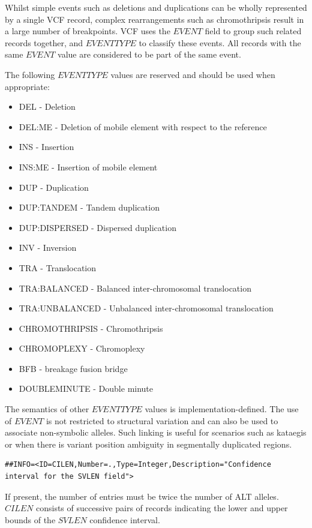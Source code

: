 \documentclass[8pt]{article}
\begin{document}
Whilst simple events such as deletions and duplications can be wholly represented by a single VCF record, complex rearrangements such as chromothripsis result in a large number of breakpoints.
VCF uses the $EVENT$ field to group such related records together, and $EVENTTYPE$ to classify these events.
All records with the same $EVENT$ value are considered to be part of the same event.

The following $EVENTTYPE$ values are reserved and should be used when appropriate:

\begin{itemize}
  \item DEL - Deletion
  \item DEL:ME - Deletion of mobile element with respect to the reference
  \item INS - Insertion
  \item INS:ME - Insertion of mobile element
  \item DUP - Duplication
  \item DUP:TANDEM - Tandem duplication
  \item DUP:DISPERSED - Dispersed duplication
  \item INV - Inversion
  \item TRA - Translocation
  \item TRA:BALANCED - Balanced inter-chromosomal translocation
  \item TRA:UNBALANCED - Unbalanced inter-chromosomal translocation
  \item CHROMOTHRIPSIS - Chromothripsis
  \item CHROMOPLEXY - Chromoplexy
  \item BFB - breakage fusion bridge
  \item DOUBLEMINUTE - Double minute
\end{itemize}
The semantics of other $EVENTTYPE$ values is implementation-defined.
The use of $EVENT$ is not restricted to structural variation and can also be used to associate non-symbolic alleles.
Such linking is useful for scenarios such as kataegis or when there is variant position ambiguity in segmentally duplicated regions.

\footnotesize
\begin{verbatim}
##INFO=<ID=CILEN,Number=.,Type=Integer,Description="Confidence interval for the SVLEN field">
\end{verbatim}
\normalsize

If present, the number of entries must be twice the number of ALT alleles.
$CILEN$ consists of successive pairs of records indicating the lower and upper bounds of the $SVLEN$ confidence interval.
\end{document}
